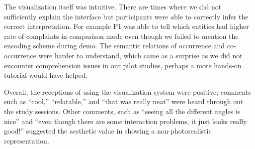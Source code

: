 The visualization itself was intuitive. There are times where we did not
sufficiently explain the interface but participants were able to correctly infer
the correct interpretation. For example P1 was able to tell which entities had higher rate
of complaints in comparison mode even though we failed to mention the encoding scheme during demo. 
The semantic relations of occurrence and co-occurrence were harder to understand, which 
came as a surprise as we did not encounter comprehension issues in our pilot studies, 
perhaps a more hands-on tutorial would have helped.

Overall, the receptions of using the visualization system were positive;
comments such as ``cool,'' ``relatable,'' and ``that was really neat'' were heard
through out the study sessions. Other comments, such as ``seeing all the different angles is
nice'' and ``even though there are some interaction problems, it just looks
really good!'' suggested the aesthetic value in showing a non-photorealistic \threed
representation.  
  